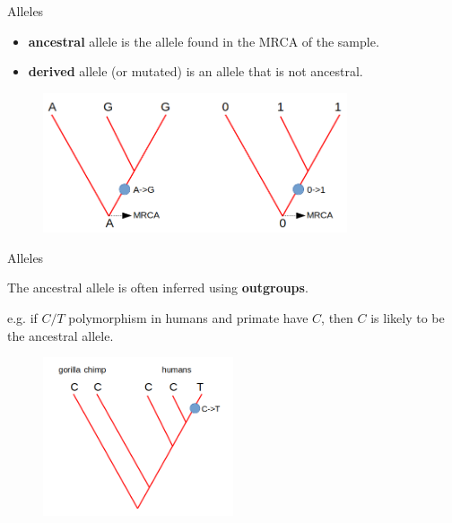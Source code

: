 \begin{frame}{Alleles}

	\small
	\begin{itemize}
		\item \textbf{ancestral} allele is the allele found in the MRCA of the sample.
		\item \textbf{derived} allele (or mutated) is an allele that is not ancestral.
	\end{itemize}

	\begin{figure}
        	\includegraphics[width=0.8\textwidth]{Pics/ancder}
        \end{figure}

\end{frame}


\begin{frame}{Alleles}

	\bigskip
	\small
	The ancestral allele is often inferred using \textbf{outgroups}.
	
	e.g. if $C/T$ polymorphism in humans and primate have $C$, then $C$ is likely to be the ancestral allele.

	\begin{figure}
                \includegraphics[width=0.5\textwidth]{Pics/ancder_species}
        \end{figure}

\end{frame}



